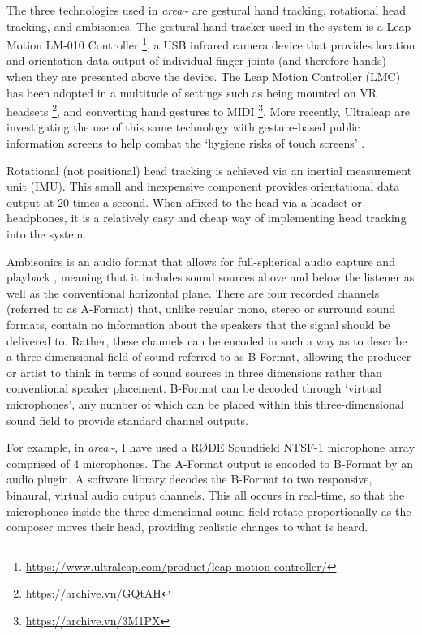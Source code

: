 The three technologies used in \textit{area\textasciitilde{}} are gestural hand tracking, rotational head tracking, and ambisonics. The gestural hand tracker used in the system is a Leap Motion LM-010 Controller \footnote{\url{https://www.ultraleap.com/product/leap-motion-controller/}}, a USB infrared camera device that provides location and orientation data output of individual finger joints (and therefore hands) when they are presented above the device. The Leap Motion Controller (LMC) has been adopted in a multitude of settings such as being mounted on VR headsets \footnote{\url{https://archive.vn/GQtAH}}, and converting hand gestures to MIDI \footnote{\url{https://archive.vn/3M1PX}}. More recently, Ultraleap are investigating the use of this same technology with gesture-based public information screens to help combat the `hygiene risks of touch screens' \citeyearpar{ultraleap2020a}.

Rotational (not positional) head tracking is achieved via an inertial measurement unit (IMU). This small and inexpensive component provides orientational data output at 20 times a second. When affixed to the head via a headset or headphones, it is a relatively easy and cheap way of implementing head tracking into the system.

Ambisonics is an audio format that allows for full-spherical audio capture and playback \citep{gerzon1973}, meaning that it includes sound sources above and below the listener as well as the conventional horizontal plane. There are four recorded channels (referred to as A-Format) that, unlike regular mono, stereo or surround sound formats, contain no information about the speakers that the signal should be delivered to. Rather, these channels can be encoded in such a way as to describe a three-dimensional field of sound referred to as B-Format, allowing the producer or artist to think in terms of sound sources in three dimensions rather than conventional speaker placement. B-Format can be decoded through `virtual microphones', any number of which can be placed within this three-dimensional sound field to provide standard channel outputs.

For example, in \textit{area\textasciitilde{}}, I have used a RØDE Soundfield NTSF-1 microphone array comprised of 4 microphones. The A-Format output is encoded to B-Format by an audio plugin. A software library decodes the B-Format to two responsive, binaural, virtual audio output channels. This all occurs in real-time, so that the microphones inside the three-dimensional sound field rotate proportionally as the composer moves their head, providing realistic changes to what is heard.



